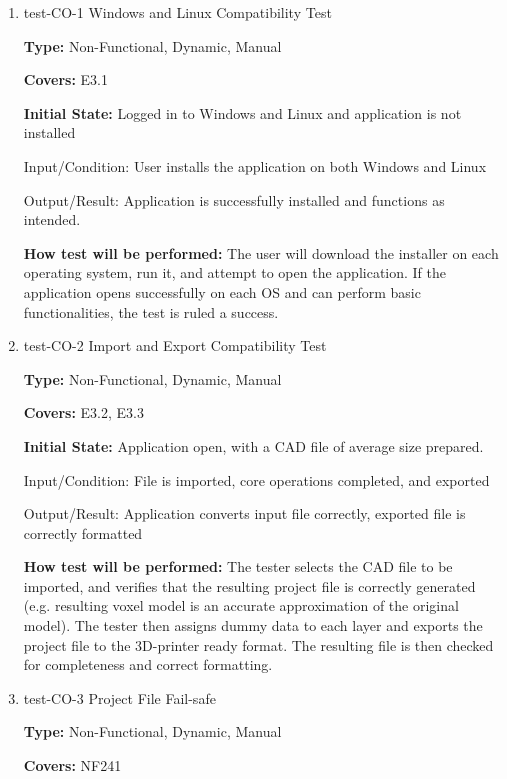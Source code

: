 \documentclass[12pt, titlepage]{article}
\begin{document}
\begin{enumerate}

\item{test-CO-1 Windows and Linux Compatibility Test\\}

\textbf{Type:} Non-Functional, Dynamic, Manual

\textbf{Covers:} E3.1
					
\textbf{Initial State:} Logged in to Windows and Linux and application is not installed
					
Input/Condition: User installs the application on both Windows and Linux
					
Output/Result: Application is successfully installed and functions as intended.
					
\textbf{How test will be performed:} The user will download the installer on each operating system, run it, and attempt to open the
application. If the application opens successfully on each OS and can perform basic functionalities, the test is ruled a success.
					
\item{test-CO-2 Import and Export Compatibility Test\\}

\textbf{Type:} Non-Functional, Dynamic, Manual

\textbf{Covers:} E3.2, E3.3
					
\textbf{Initial State:} Application open, with a CAD file of average size prepared.
					
Input/Condition: File is imported, core operations completed, and exported
					
Output/Result: Application converts input file correctly, exported file is correctly formatted
					
\textbf{How test will be performed:} The tester selects the CAD file to be imported, and verifies that the resulting project file 
is correctly generated (e.g. resulting voxel model is an accurate approximation of the original model). The tester then assigns 
dummy data to each layer and exports the project file to the 3D-printer ready format. The resulting file is then checked for
completeness and correct formatting. 

\item{test-CO-3 Project File Fail-safe\\} 

\textbf{Type:} Non-Functional, Dynamic, Manual

\textbf{Covers:} NF241
					

\end{enumerate}
\end{document}
